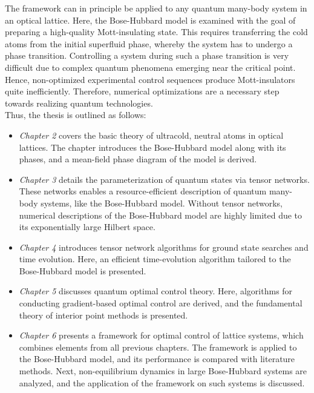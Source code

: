 The framework can in principle be applied to any quantum many-body system in an optical lattice. Here, the Bose-Hubbard model is examined with the goal of preparing a high-quality Mott-insulating state. This requires transferring the cold atoms from the initial superfluid phase, whereby the system has to undergo a phase transition. Controlling a system during such a phase transition is very difficult due to complex quantum phenomena emerging near the critical point. Hence, non-optimized experimental control sequences produce Mott-insulators quite inefficiently. Therefore, numerical optimizations are a necessary step towards realizing quantum technologies.\\
Thus, the thesis is outlined as follows:
\begin{itemize}
\item[]
\textit{Chapter 2} covers the basic theory of ultracold, neutral atoms in optical lattices. The chapter introduces the Bose-Hubbard model along with its phases, and a mean-field phase diagram of the model is derived.

\item[]
\textit{Chapter 3} details the parameterization of quantum states via tensor networks. These networks enables a resource-efficient description of quantum many-body systems, like the Bose-Hubbard model. Without tensor networks, numerical descriptions of the Bose-Hubbard model are highly limited due to its exponentially large Hilbert space.

\item[]
\textit{Chapter 4} introduces tensor network algorithms for ground state searches and time evolution. Here, an efficient time-evolution algorithm tailored to the Bose-Hubbard model is presented.

\item[]
\textit{Chapter 5} discusses quantum optimal control theory. Here, algorithms for conducting gradient-based optimal control are derived, and the fundamental theory of interior point methods is presented.

\item[]
\textit{Chapter 6} presents a framework for optimal control of lattice systems, which combines elements from all previous chapters. The framework is applied to the Bose-Hubbard model, and its performance is compared with literature methods. Next, non-equilibrium dynamics in large Bose-Hubbard systems are analyzed, and the application of the framework on such systems is discussed.     
\end{itemize}
